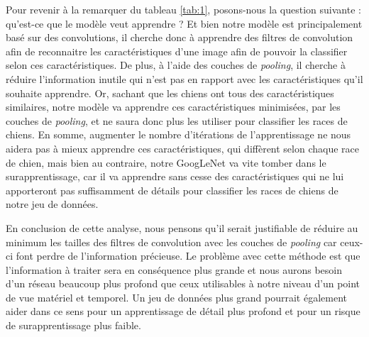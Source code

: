 \documentclass{article}
\begin{document}
Pour revenir à la remarquer du tableau \ref{tab:1}, posons-nous la question
suivante : qu’est-ce que le modèle veut apprendre ? Et bien notre modèle est
principalement basé sur des convolutions, il cherche donc à apprendre des
filtres de convolution afin de reconnaitre les caractéristiques d’une image afin
de pouvoir la classifier selon ces caractéristiques. De plus, à l’aide des
couches de \textit{pooling}, il cherche à réduire l’information inutile qui
n’est pas en rapport avec les caractéristiques qu’il souhaite apprendre. Or,
sachant que les chiens ont tous des caractéristiques similaires, notre modèle va
apprendre ces caractéristiques minimisées, par les couches de \textit{pooling},
et ne saura donc plus les utiliser pour classifier les races de chiens. En
somme, augmenter le nombre d’itérations de l’apprentissage ne nous aidera pas à
mieux apprendre ces caractéristiques, qui diffèrent selon chaque race de chien,
mais bien au contraire, notre GoogLeNet va vite tomber dans le surapprentissage,
car il va apprendre sans cesse des caractéristiques qui ne lui apporteront pas
suffisamment de détails pour classifier les races de chiens de notre jeu de
données. 

En conclusion de cette analyse, nous pensons qu’il serait justifiable de réduire
au minimum les tailles des filtres de convolution avec les couches de
\textit{pooling} car ceux-ci font perdre de l’information précieuse. Le problème
avec cette méthode est que l’information à traiter sera en conséquence plus
grande et nous aurons besoin d’un réseau beaucoup plus profond que ceux
utilisables à notre niveau d’un point de vue matériel et temporel. Un jeu de
données plus grand pourrait également aider dans ce sens pour un apprentissage
de détail plus profond et pour un risque de surapprentissage plus faible.



\end{document}
